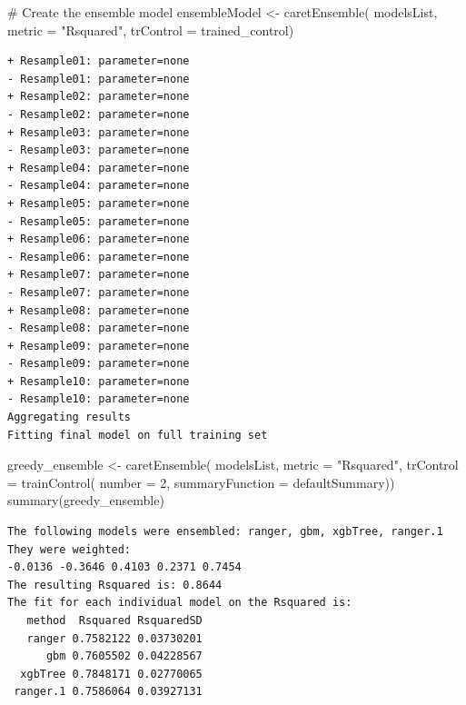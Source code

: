 \documentclass[
  letterpaper,
  DIV=11,
  numbers=noendperiod]{scrartcl}
\newenvironment{Shaded}{\begin{snugshade}}{\end{snugshade}}
\newcommand{\AttributeTok}[1]{\textcolor[rgb]{0.40,0.45,0.13}{#1}}
\newcommand{\CommentTok}[1]{\textcolor[rgb]{0.37,0.37,0.37}{#1}}
\newcommand{\DecValTok}[1]{\textcolor[rgb]{0.68,0.00,0.00}{#1}}
\newcommand{\FunctionTok}[1]{\textcolor[rgb]{0.28,0.35,0.67}{#1}}
\newcommand{\NormalTok}[1]{\textcolor[rgb]{0.00,0.23,0.31}{#1}}
\newcommand{\OtherTok}[1]{\textcolor[rgb]{0.00,0.23,0.31}{#1}}
\newcommand{\StringTok}[1]{\textcolor[rgb]{0.13,0.47,0.30}{#1}}
\begin{document}
\begin{Shaded}
\begin{Highlighting}[]
\CommentTok{\# Create the ensemble model}
\NormalTok{ensembleModel }\OtherTok{\textless{}{-}} \FunctionTok{caretEnsemble}\NormalTok{(}
\NormalTok{    modelsList,}
    \AttributeTok{metric =} \StringTok{"Rsquared"}\NormalTok{,}
    \AttributeTok{trControl =}\NormalTok{ trained\_control)}
\end{Highlighting}
\end{Shaded}

\begin{verbatim}
+ Resample01: parameter=none 
- Resample01: parameter=none 
+ Resample02: parameter=none 
- Resample02: parameter=none 
+ Resample03: parameter=none 
- Resample03: parameter=none 
+ Resample04: parameter=none 
- Resample04: parameter=none 
+ Resample05: parameter=none 
- Resample05: parameter=none 
+ Resample06: parameter=none 
- Resample06: parameter=none 
+ Resample07: parameter=none 
- Resample07: parameter=none 
+ Resample08: parameter=none 
- Resample08: parameter=none 
+ Resample09: parameter=none 
- Resample09: parameter=none 
+ Resample10: parameter=none 
- Resample10: parameter=none 
Aggregating results
Fitting final model on full training set
\end{verbatim}

\begin{Shaded}
\begin{Highlighting}[]
\NormalTok{greedy\_ensemble }\OtherTok{\textless{}{-}} \FunctionTok{caretEnsemble}\NormalTok{(}
\NormalTok{    modelsList,}
    \AttributeTok{metric =} \StringTok{"Rsquared"}\NormalTok{,}
    \AttributeTok{trControl =} \FunctionTok{trainControl}\NormalTok{(}
        \AttributeTok{number =} \DecValTok{2}\NormalTok{,}
        \AttributeTok{summaryFunction =}\NormalTok{ defaultSummary))}
\FunctionTok{summary}\NormalTok{(greedy\_ensemble)}
\end{Highlighting}
\end{Shaded}

\begin{verbatim}
The following models were ensembled: ranger, gbm, xgbTree, ranger.1 
They were weighted: 
-0.0136 -0.3646 0.4103 0.2371 0.7454
The resulting Rsquared is: 0.8644
The fit for each individual model on the Rsquared is: 
   method  Rsquared RsquaredSD
   ranger 0.7582122 0.03730201
      gbm 0.7605502 0.04228567
  xgbTree 0.7848171 0.02770065
 ranger.1 0.7586064 0.03927131
\end{verbatim}
\end{document}
